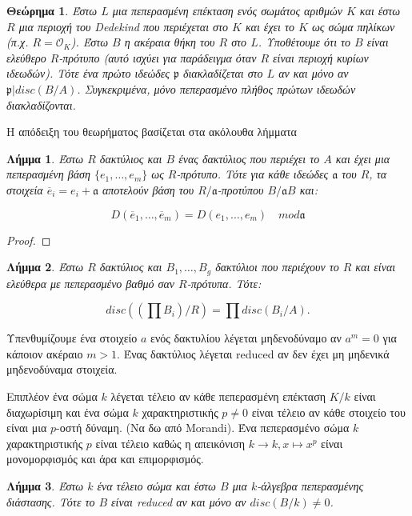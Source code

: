 \documentclass[oneside,a4paper]{article}
\newtheorem{theorem}{Θεώρημα}
\newtheorem{lemma}{Λήμμα}
\newcommand {\tl}{\textlatin}
\begin{document}
\pagebreak


\begin{theorem} Έστω $L$ μια πεπερασμένη επέκταση ενός σωμάτος αριθμών $K$ και έστω $R$ μια περιοχή του \tl{Dedekind} που περιέχεται στο $K$ και έχει το $K$ ως σώμα πηλίκων (π.χ. $R = \mathcal{O}_K$). Έστω $B$ η ακέραια θήκη του $R$ στο $L$. Υποθέτουμε ότι το $B$ είναι ελεύθερο $R$-πρότυπο (αυτό ισχύει για παράδειγμα όταν $R$ είναι περιοχή κυρίων ιδεωδών). Τότε ένα πρώτο ιδεώδες $\mathfrak{p}$ διακλαδίζεται στο $L$ αν και μόνο αν $\mathfrak{p} | disc(B/A)$. Συγκεκριμένα, μόνο πεπερασμένο πλήθος πρώτων ιδεωδών διακλαδίζονται.
\end{theorem}


Η απόδειξη του θεωρήματος βασίζεται στα ακόλουθα λήμματα

\begin{lemma}
	Έστω $R$ δακτύλιος και $B$ ένας δακτύλιος που περιέχει το $A$ και έχει μια πεπερασμένη βάση $\{e_1,\ldots,e_m\}$ ως $R$-πρότυπο. Τότε για κάθε ιδεώδες $\mathfrak{a}$ του $R$, τα στοιχεία $\overline{e}_i = e_i + \mathfrak{a}$ αποτελούν βάση του $R/\mathfrak{a}$-προτύπου $B/\mathfrak{a}B$ και:

	$$D(\overline{e}_1 ,\ldots, \overline{e}_m) = D(e_1,\ldots, e_m) \quad mod\mathfrak{a}$$
\end{lemma}

\begin{proof}
\end{proof}


\begin{lemma}
	Έστω $R$ δακτύλιος και $B_1,\ldots, B_g$ δακτύλιοι που περιέχουν το $R$ και είναι ελεύθερα με πεπερασμένο βαθμό σαν $R$-πρότυπα. Τότε:

	$$disc((\prod B_i) / R) = \prod disc(B_i/A).$$
\end{lemma}

Υπενθυμίζουμε ένα στοιχείο $a$ ενός δακτυλίου λέγεται μηδενοδύναμο αν $a^m = 0$ για κάποιον ακέραιο $m>1$. Ένας δακτύλιος λέγεται \tl{reduced} αν δεν έχει μη μηδενικά μηδενοδύναμα στοιχεία.

Επιπλέον ένα σώμα $k$ λέγεται τέλειο αν κάθε πεπερασμένη επέκταση $K/k$ είναι διαχωρίσιμη και ένα σώμα $k$ χαρακτηριστικής $p\neq 0$ είναι τέλειο αν κάθε στοιχείο του είναι μια $p$-οστή δύναμη. (Να δω από \tl{Morandi}). Ένα πεπερασμένο σώμα $k$ χαρακτηριστικής $p$ είναι τέλειο καθώς η απεικόνιση $k\rightarrow k, x \mapsto x^p$ είναι μονομορφισμός και άρα και επιμορφισμός.


\begin{lemma} Έστω $k$ ένα τέλειο σώμα και έστω $B$ μια $k$-άλγεβρα πεπερασμένης διάστασης. Τότε το $B$ είναι \tl{reduced} αν και μόνο αν $disc(B/k) \neq 0$.
\end{lemma}
\end{document}
